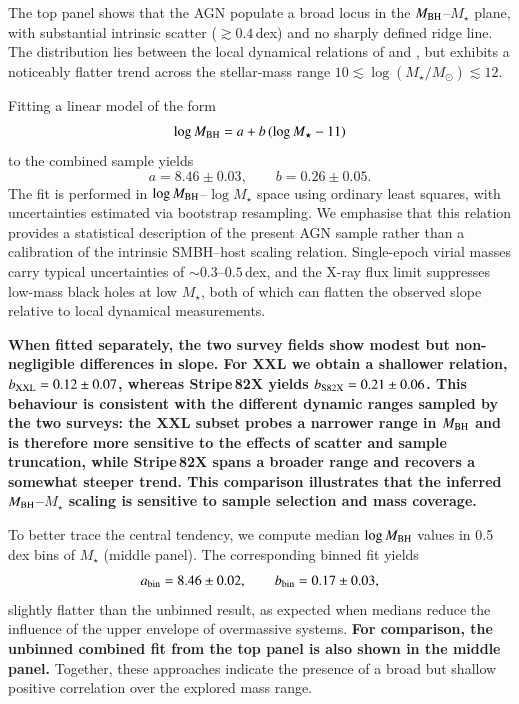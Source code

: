 \documentclass{aa}
\begin{document}
The top panel shows that the AGN populate a broad locus in the $M_{\rm BH}$--$M_{\star}$ plane, with substantial intrinsic scatter ($\gtrsim 0.4$\,dex) and no sharply defined ridge line. The distribution lies between the local dynamical relations of \citet{Haring2004} and \citet{Kormendy2013}, but exhibits a noticeably flatter trend across the stellar-mass range $10 \lesssim \log(M_\star/M_\odot) \lesssim 12$.

Fitting a linear model of the form
\begin{equation}
\log M_{\rm BH} = a + b\,(\log M_{\star} - 11)
\end{equation}
to the combined sample yields
\begin{equation}
a = 8.46 \pm 0.03,\qquad
b = 0.26 \pm 0.05.
\end{equation}
The fit is performed in $\log M_{\rm BH}$--$\log M_{\star}$ space using ordinary least squares, with uncertainties estimated via bootstrap resampling. We emphasise that this relation provides a statistical description of the present AGN sample rather than a calibration of the intrinsic SMBH--host scaling relation. Single-epoch virial masses carry typical uncertainties of $\sim0.3$--$0.5$\,dex, and the X-ray flux limit suppresses low-mass black holes at low $M_{\star}$, both of which can flatten the observed slope relative to local dynamical measurements.

\textbf{When fitted separately, the two survey fields show modest but non-negligible differences in slope. 
For XXL we obtain a shallower relation, $b_{\rm XXL}=0.12\pm0.07$, whereas Stripe\,82X yields $b_{\rm S82X}=0.21\pm0.06$. 
This behaviour is consistent with the different dynamic ranges sampled by the two surveys: the XXL subset probes a narrower range in $M_{\rm BH}$ and is therefore more sensitive to the effects of scatter and sample truncation, while Stripe\,82X spans a broader range and recovers a somewhat steeper trend. 
This comparison illustrates that the inferred $M_{\rm BH}$--$M_\star$ scaling is sensitive to sample selection and mass coverage.}

To better trace the central tendency, we compute median $\log M_{\rm BH}$ values in 0.5\,dex bins of $M_\star$ (middle panel). The corresponding binned fit yields
\begin{equation}
a_{\rm bin} = 8.46 \pm 0.02,\qquad
b_{\rm bin} = 0.17 \pm 0.03,
\end{equation}
slightly flatter than the unbinned result, as expected when medians reduce the influence of the upper envelope of overmassive systems. \textbf{For comparison, the unbinned combined fit from the top panel is also shown in the middle panel.} Together, these approaches indicate the presence of a broad but shallow positive correlation over the explored mass range.
\end{document}
